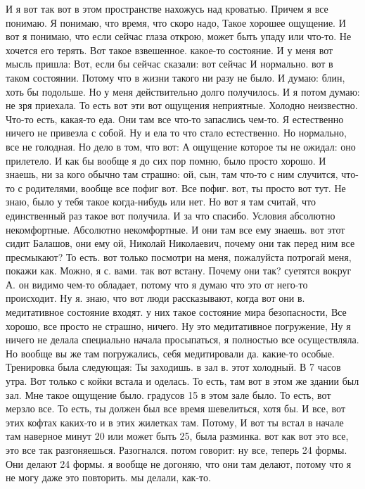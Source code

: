 И я вот так вот в этом пространстве нахожусь над кроватью.
Причем я все понимаю.
Я понимаю, что время, что скоро надо, Такое хорошее ощущение.
И вот я понимаю, что если сейчас глаза открою, может быть упаду или что-то.
Не хочется его терять.
Вот такое взвешенное.
какое-то состояние.
И у меня вот мысль пришла:
Вот, если бы сейчас сказали: вот сейчас И нормально. вот в таком состоянии.
Потому что в жизни такого ни разу не было.
И думаю: блин, хоть бы подольше.
Но у меня действительно долго получилось.
И я потом думаю: не зря приехала.
То есть вот эти вот ощущения неприятные.
Холодно неизвестно.
Что-то есть, какая-то еда.
Они там все что-то запаслись чем-то.
Я естественно ничего не привезла с собой.
Ну и ела то что стало естественно.
Но нормально, все не голодная.
Но дело в том, что вот:
А ощущение которое ты не ожидал: оно прилетело.
И как бы вообще я до сих пор помню, было просто хорошо.
И знаешь, ни за кого обычно там страшно: ой, сын, там что-то с ним случится, что-то с родителями, вообще все пофиг вот.
Все пофиг. вот, ты просто вот тут.
Не знаю, было у тебя такое когда-нибудь или нет.
Но вот я там считай, что единственный раз такое вот получила.
И за что спасибо.
Условия абсолютно некомфортные.
Абсолютно некомфортные.
И они там все ему знаешь. вот этот сидит Балашов, они ему ой, Николай Николаевич, почему они так перед ним все пресмыкают?
То есть. вот только посмотри на меня, пожалуйста потрогай меня, покажи как.
Можно, я с. вами.
так вот встану. Почему они так?
суетятся вокруг А.
он видимо чем-то обладает, потому что я думаю что
это от него-то происходит. Ну я.
знаю, что вот люди рассказывают, когда вот они в.
медитативное состояние входят.
у них такое состояние мира безопасности, Все хорошо, все просто не страшно, ничего. Ну это медитативное погружение, Ну я ничего не делала специально начала просыпаться, я полностью все осуществляла. Но вообще вы же там погружались, себя медитировали да.
какие-то особые. Тренировка была следующая: Ты заходишь.
в зал в.
этот холодный.
В 7 часов утра.
Вот только с койки встала и оделась.
То есть, там вот в этом же здании был зал.
Мне такое ощущение было. градусов 15 в этом зале было.
То есть, вот мерзло все.
То есть, ты должен был все время шевелиться, хотя бы.
И все, вот этих кофтах каких-то и в этих жилетках там.
Потому, И вот ты встал в начале там наверное минут 20 или может быть 25, была разминка. вот как вот это все, это все так разгоняешься.
Разогнался. потом говорит: ну все, теперь 24 формы.
Они делают 24 формы. я вообще не догоняю, что они там делают, потому что я не могу даже это повторить. мы делали, как-то.
